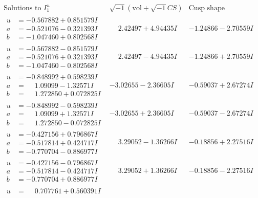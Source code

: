 \documentclass[1p]{elsarticle_modified}
\theoremstyle{definition}
\newcommand{\I}{\sqrt{-1}}
\begin{document}
$$\begin{array}{c|c|c}  
\text{Solutions to }I^u_{1}& \I (\text{vol} + \sqrt{-1}CS) & \text{Cusp shape}\\
 \hline 
\begin{aligned}
u &= -0.567882 + 0.851579 I \\
a &= -0.521076 - 0.321393 I \\
b &= -1.047460 + 0.802568 I\end{aligned}
 & \phantom{-}2.42497 + 4.94435 I & -1.24866 - 2.70559 I \\ \hline\begin{aligned}
u &= -0.567882 - 0.851579 I \\
a &= -0.521076 + 0.321393 I \\
b &= -1.047460 - 0.802568 I\end{aligned}
 & \phantom{-}2.42497 - 4.94435 I & -1.24866 + 2.70559 I \\ \hline\begin{aligned}
u &= -0.848992 + 0.598239 I \\
a &= \phantom{-}1.09099 - 1.32571 I \\
b &= \phantom{-}1.272850 + 0.072825 I\end{aligned}
 & -3.02655 - 2.36605 I & -0.59037 + 2.67274 I \\ \hline\begin{aligned}
u &= -0.848992 - 0.598239 I \\
a &= \phantom{-}1.09099 + 1.32571 I \\
b &= \phantom{-}1.272850 - 0.072825 I\end{aligned}
 & -3.02655 + 2.36605 I & -0.59037 - 2.67274 I \\ \hline\begin{aligned}
u &= -0.427156 + 0.796867 I \\
a &= -0.517814 + 0.424717 I \\
b &= -0.770704 - 0.886977 I\end{aligned}
 & \phantom{-}3.29052 - 1.36266 I & -0.18856 + 2.27516 I \\ \hline\begin{aligned}
u &= -0.427156 - 0.796867 I \\
a &= -0.517814 - 0.424717 I \\
b &= -0.770704 + 0.886977 I\end{aligned}
 & \phantom{-}3.29052 + 1.36266 I & -0.18856 - 2.27516 I \\ \hline\begin{aligned}
u &= \phantom{-}0.707761 + 0.560391 I \\

\end{aligned}
\end{array}$$
\end{document}
